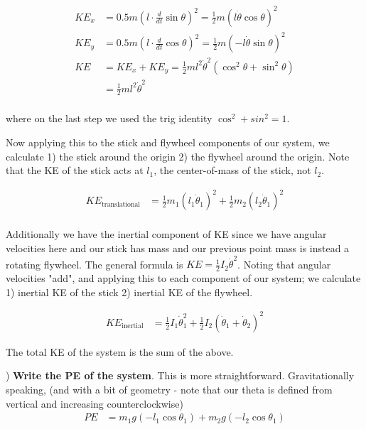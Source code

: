 \documentclass[conference]{IEEEtran}
\begin{document}
\begin{align}
    KE_x &= 0.5 m (l \cdot \frac{d}{dt} \sin \theta)^2 = \frac{1}{2} m (l \dot\theta \cos \theta)^2 \\
    KE_y &= 0.5 m (l \cdot \frac{d}{dt} \cos \theta)^2  = \frac{1}{2} m (- l \dot\theta \sin\theta)^2 \\
    KE &= KE_x + KE_y = \frac{1}{2} m l^2 \dot \theta^2 (\cos^2 \theta + \sin^2 \theta) \\
       &= \frac{1}{2} m l^2 \dot\theta^2 \\
\end{align}

where on the last step we used the trig identity $\cos^2 + sin^2 = 1$.

Now applying this to the stick and flywheel components of our system, we
calculate 1) the stick around the origin 2) the flywheel around the origin. Note
that the KE of the stick acts at $l_1$, the center-of-mass of the stick, not
$l_2$.

\begin{align}
    KE_{\text{translational}} &= \frac{1}{2} m_1 (l_1 \dot\theta_1)^2 + \frac{1}{2} m_2 (l_2 \dot\theta_1)^2\\
\end{align}

Additionally we have the inertial component of KE since we have angular
velocities here and our stick has mass and our previous point mass is instead a rotating
flywheel. The general formula is $KE = \frac{1}{2} I_2 \dot\theta^2$.
Noting that angular velocities "add", and applying this to each component of our
system; we calculate 1) inertial KE of the stick 2) inertial KE of the flywheel.

\begin{align}
    KE_{\text{inertial}} &= \frac{1}{2} I_1 \dot\theta_1^2 + \frac{1}{2}
    I_2 (\dot\theta_1 + \dot\theta_2)^2
\end{align}

The total KE of the system is the sum of the above.

) \textbf{Write the PE of the system}. This is more straightforward. Gravitationally
speaking, (and with a bit of geometry - note that our theta is defined from
vertical and increasing counterclockwise)
\begin{align}
    PE &= m_1 g (- l_1 \cos\theta_1) + m_2 g (- l_2 \cos\theta_1)
\end{align}
\end{document}
